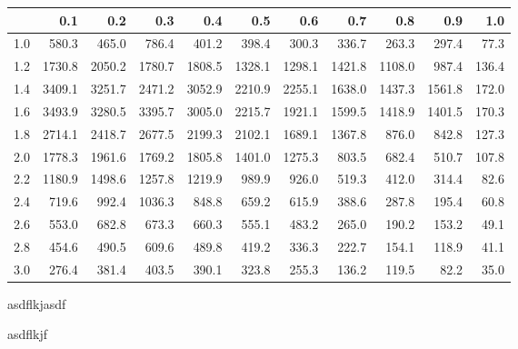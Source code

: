 \begin{tabular}{r|rrrrrrrrrr}
  \hline
 & 0.1 & 0.2 & 0.3 & 0.4 & 0.5 & 0.6 & 0.7 & 0.8 & 0.9 & 1.0 \\ 
  \hline
1.0 & 580.3 & 465.0 & 786.4 & 401.2 & 398.4 & 300.3 & 336.7 & 263.3 & 297.4 & 77.3 \\ 
  1.2 & 1730.8 & 2050.2 & 1780.7 & 1808.5 & 1328.1 & 1298.1 & 1421.8 & 1108.0 & 987.4 & 136.4 \\ 
  1.4 & 3409.1 & 3251.7 & 2471.2 & 3052.9 & 2210.9 & 2255.1 & 1638.0 & 1437.3 & 1561.8 & 172.0 \\ 
  1.6 & 3493.9 & 3280.5 & 3395.7 & 3005.0 & 2215.7 & 1921.1 & 1599.5 & 1418.9 & 1401.5 & 170.3 \\ 
  1.8 & 2714.1 & 2418.7 & 2677.5 & 2199.3 & 2102.1 & 1689.1 & 1367.8 & 876.0 & 842.8 & 127.3 \\ 
  2.0 & 1778.3 & 1961.6 & 1769.2 & 1805.8 & 1401.0 & 1275.3 & 803.5 & 682.4 & 510.7 & 107.8 \\ 
  2.2 & 1180.9 & 1498.6 & 1257.8 & 1219.9 & 989.9 & 926.0 & 519.3 & 412.0 & 314.4 & 82.6 \\ 
  2.4 & 719.6 & 992.4 & 1036.3 & 848.8 & 659.2 & 615.9 & 388.6 & 287.8 & 195.4 & 60.8 \\ 
  2.6 & 553.0 & 682.8 & 673.3 & 660.3 & 555.1 & 483.2 & 265.0 & 190.2 & 153.2 & 49.1 \\ 
  2.8 & 454.6 & 490.5 & 609.6 & 489.8 & 419.2 & 336.3 & 222.7 & 154.1 & 118.9 & 41.1 \\ 
  3.0 & 276.4 & 381.4 & 403.5 & 390.1 & 323.8 & 255.3 & 136.2 & 119.5 & 82.2 & 35.0 \\ 
   \hline
\end{tabular}

asdflkjasdf


asdflkjf

